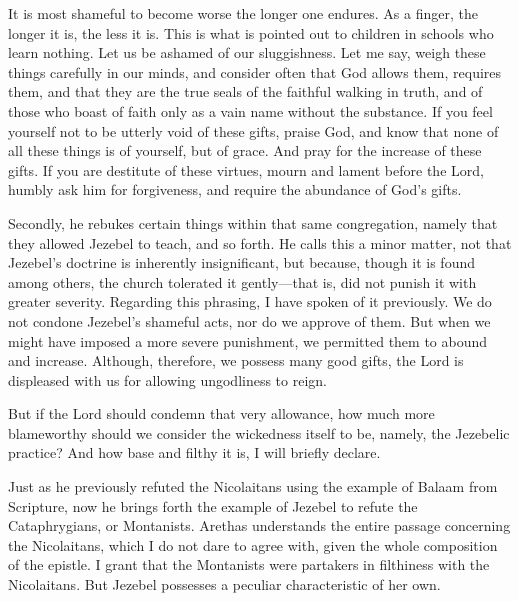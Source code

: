 It is most shameful to become worse the longer one endures. As a finger, the longer it is, the less it is. This is what is pointed out to children in schools who learn nothing. Let us be ashamed of our sluggishness. Let me say, weigh these things carefully in our minds, and consider often that God allows them, requires them, and that they are the true seals of the faithful walking in truth, and of those who boast of faith only as a vain name without the substance. If you feel yourself not to be utterly void of these gifts, praise God, and know that none of all these things is of yourself, but of grace. And pray for the increase of these gifts. If you are destitute of these virtues, mourn and lament before the Lord, humbly ask him for forgiveness, and require the abundance of God’s gifts.

Secondly, he rebukes certain things within that same congregation, namely that they allowed Jezebel to teach, and so forth. He calls this a minor matter, not that Jezebel’s doctrine is inherently insignificant, but because, though it is found among others, the church tolerated it gently—that is, did not punish it with greater severity. Regarding this phrasing, I have spoken of it previously. We do not condone Jezebel’s shameful acts, nor do we approve of them. But when we might have imposed a more severe punishment, we permitted them to abound and increase. Although, therefore, we possess many good gifts, the Lord is displeased with us for allowing ungodliness to reign.

But if the Lord should condemn that very allowance, how much more blameworthy should we consider the wickedness itself to be, namely, the Jezebelic practice? And how base and filthy it is, I will briefly declare.

Just as he previously refuted the Nicolaitans using the example of Balaam from Scripture, now he brings forth the example of Jezebel to refute the Cataphrygians, or Montanists. Arethas understands the entire passage concerning the Nicolaitans, which I do not dare to agree with, given the whole composition of the epistle. I grant that the Montanists were partakers in filthiness with the Nicolaitans. But Jezebel possesses a peculiar characteristic of her own.

